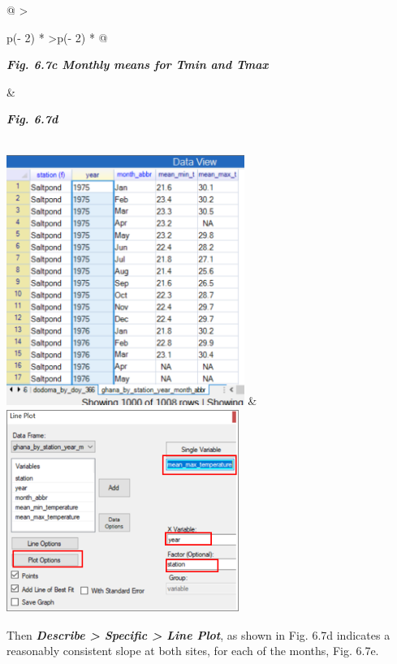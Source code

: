 \documentclass[
  letterpaper,
  DIV=11,
  numbers=noendperiod]{scrreprt}
\begin{document}
\begin{longtable}[]{@{}
  >{\raggedright\arraybackslash}p{(\columnwidth - 2\tabcolsep) * }
  >{\centering\arraybackslash}p{(\columnwidth - 2\tabcolsep) * }@{}}
\toprule\noalign{}
\begin{minipage}[b]{\linewidth}\raggedright
\textbf{\emph{Fig. 6.7c Monthly means for Tmin and Tmax}}
\end{minipage} & \begin{minipage}[b]{\linewidth}\centering
\textbf{\emph{Fig. 6.7d}}
\end{minipage} \\
\midrule\noalign{}
\endhead
\bottomrule\noalign{}
\endlastfoot
\includegraphics[width=3.04795in,height=3.2116in]{figures/Fig6.7c.png} &
\includegraphics[width=2.97447in,height=2.61065in]{figures/Fig6.7d.png} \\
\end{longtable}

Then \textbf{\emph{Describe \textgreater{} Specific \textgreater{} Line
Plot}}, as shown in Fig. 6.7d indicates a reasonably consistent slope at
both sites, for each of the months, Fig. 6.7e.
\end{document}

